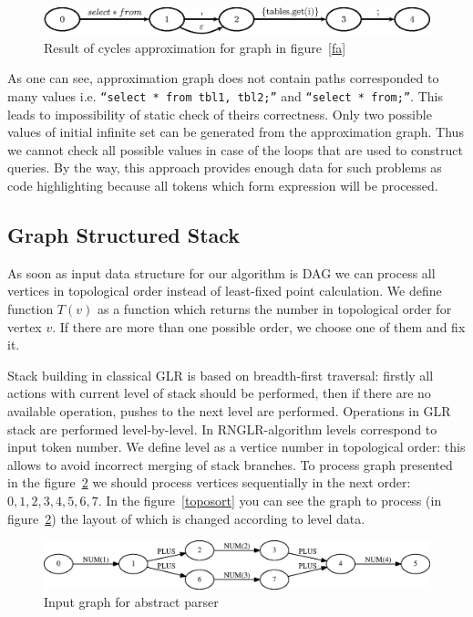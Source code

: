 \documentclass{sigplanconf}
\begin{document}
\begin{figure}[h!]
    \begin{center}
        \includegraphics[scale=0.5]{Graphs/cyclesApproximation.eps}
    \end{center}
    \caption{Result of cycles approximation for graph in figure~\ref{fa}}
    \label{faApprox}
\end{figure}

As one can see, approximation graph does not contain paths corresponded to many values i.e. \verb|“select * from tbl1, tbl2;”| and \verb|“select * from;”|. This leads to impossibility of static check of theirs correctness. Only two possible values of initial infinite set can be generated from the approximation graph. Thus we cannot check all possible values in case of the loops that are used to construct queries. By the way, this approach provides enough data for such problems as code highlighting because all tokens which form expression will be processed. 

\subsection{Graph Structured Stack}

As soon as input data structure for our algorithm is DAG we can process all vertices in topological order instead of least-fixed point calculation. We define function $T(v)$ as a function which returns the number in topological order for vertex $v$. If there are more than one possible order, we choose one of them and fix it. 


Stack building in classical GLR is based on breadth-first traversal: firstly all actions with current level of stack should be performed, then if there are no available operation, pushes to the next level are performed. Operations in GLR stack are performed level-by-level. In RNGLR-algorithm levels correspond to input token number. We define level as a vertice number in topological order: this allows to avoid incorrect merging of stack branches. To process graph presented in the figure~\ref{inp2} we should process vertices sequentially in the next order: $0, 1, 2, 3, 4, 5, 6, 7$. In the figure~\ref{toposort} you can see the graph to process (in figure~\ref{inp2}) the layout of which is changed according to level data.


\begin{figure}[h!]
    \begin{center}
        \includegraphics[scale=0.3]{Graphs/toposort0.eps}
    \end{center}
    \caption{Input graph for abstract parser}
    \label{inp2}
\end{figure}
\end{document}
